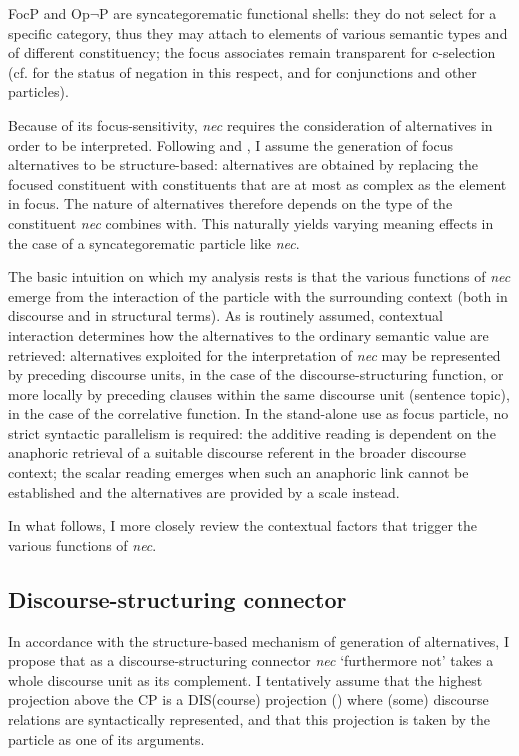 \documentclass[output=paper,modfonts,nonflat,citecolor=brown,
showindex
]{langsci/langscibook}
\begin{document}
FocP and Op$\lnot$P are syncategorematic functional shells: they do not select for a specific category, thus they may attach to elements of various semantic types and of different constituency; the focus associates remain transparent for c-selection (cf. \citealt[120--126]{Cinque99} for the status of negation in this respect, and \citealt[199--203]{BHR14} for conjunctions and other particles).

Because of its focus-sensitivity, {\emph{nec}} requires the consideration of alternatives in order to be interpreted. Following \citet{Katzir07} and \citet{FoxKatzir11}, I assume the generation of focus alternatives to be structure-based: alternatives are obtained by replacing the focused constituent with constituents that are at most as complex as the element in focus. The nature of alternatives therefore depends on the type of the constituent {\emph{nec}} combines with. This naturally yields varying meaning effects in the case of a syncategorematic particle like {\emph{nec}}.

The basic intuition on which my analysis rests is that the various functions of {\emph{nec}} emerge from the interaction of the particle with the surrounding context (both in discourse and in structural terms). As is routinely assumed, contextual interaction determines how the alternatives to the ordinary semantic value are retrieved: alternatives exploited for the interpretation of {\emph{nec}} may be represented by preceding discourse units, in the case of the discourse-structuring function, or more locally by preceding clauses within the same discourse unit (sentence topic), in the case of the correlative function. In the stand-alone use as focus particle, no strict syntactic parallelism is required: the additive reading is dependent on the anaphoric retrieval of a suitable discourse referent in the broader discourse context; the scalar reading emerges when such an anaphoric link cannot be established and the alternatives are provided by a scale instead. 

In what follows, I more closely review the contextual factors that trigger the various functions of {\emph{nec}}.

\subsection{Discourse-structuring connector} \label{analysisdiscuousestructuring}

In accordance with the structure-based mechanism of generation of alternatives, I propose that as a discourse-structuring connector {\emph{nec}} `furthermore not' takes a whole discourse unit as its complement. I tentatively assume that the highest projection above the CP is a DIS(course) projection (\citealt{Giorgi15}) where (some) discourse relations are syntactically represented, and that this projection is taken by the particle as one of its arguments.
\end{document}
